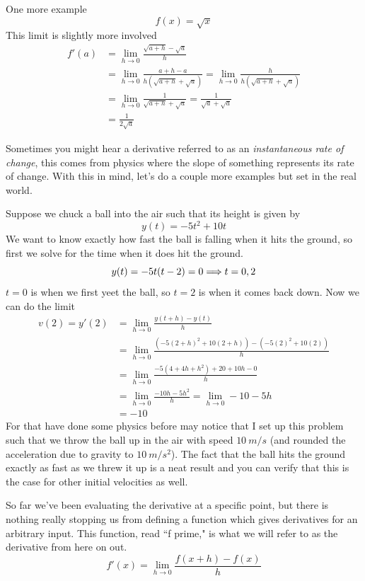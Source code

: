 \newpage 
\begin{example}
	One more example
	\[ f(x) = \sqrt{x} \]
	This limit is slightly more involved
	\begin{align*}
		f'(a) &= \lim_{h \to 0} \frac{\sqrt{a + h} - \sqrt{a}}{h} \\
		&= \lim_{h \to 0} \frac{a + h - a}{h (\sqrt{a + h} + \sqrt{a})} = \lim_{h \to 0} \frac{h}{h(\sqrt{a + h} + \sqrt{a})} \\
		&= \lim_{h \to 0} \frac{1}{\sqrt{a + h} + \sqrt{a}} = \frac{1}{\sqrt{a} + \sqrt{a}} \\
		&= \frac{1}{2 \sqrt{a}}
	\end{align*}
\end{example}

Sometimes you might hear a derivative referred to as an \emph{instantaneous rate of change}, this comes from physics where the slope of something represents its rate of change. With this in mind, let's do a couple more examples but set in the real world.

\begin{example}
	Suppose we chuck a ball into the air such that its height is given by
	\[ y(t) = -5t^2 + 10t \]
	We want to know exactly how fast the ball is falling when it hits the ground, so first we solve for the time when it does hit the ground.
	\[ y(t) = -5t(t - 2) = 0 \Longrightarrow t = 0, 2 \]
	$t = 0$ is when we first yeet the ball, so $t = 2$ is when it comes back down. Now we can do the limit
	\begin{align*}
		v(2) = y'(2) &= \lim_{h \to 0} \frac{y(t + h) - y(t)}{h} \\
		&= \lim_{h \to 0} \frac{(-5(2 + h)^2 + 10(2 + h)) - (-5(2)^2 + 10(2))}{h} \\
		&= \lim_{h \to 0} \frac{-5(4 + 4h + h^2) + 20 + 10h - 0}{h} \\
		&= \lim_{h \to 0} \frac{-10h - 5h^2}{h} = \lim_{h \to 0} -10 - 5h \\
		&= -10
	\end{align*}
	For that have done some physics before may notice that I set up this problem such that we throw the ball up in the air with speed $\SI{10}{m/s}$ (and rounded the acceleration due to gravity to $\SI{10}{m/s^2}$). The fact that the ball hits the ground exactly as fast as we threw it up is a neat result and you can verify that this is the case for other initial velocities as well.
\end{example}

So far we've been evaluating the derivative at a specific point, but there is nothing really stopping us from defining a function which gives derivatives for an arbitrary input. This function, read ``f prime," is what we will refer to as the derivative from here on out.
\[ f'(x) = \lim_{h \to 0} \frac{f(x + h) - f(x)}{h} \]

